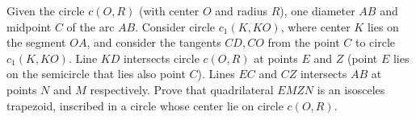 Given the circle $c(O,R)$ (with center $O$ and radius $R$), one diameter $AB$ and midpoint $C$ of the arc $AB$. Consider circle $c_1(K,KO)$, where center $K$ lies on the segment $OA$, and consider the tangents $CD,CO$ from the point $C$ to  circle $c_1(K,KO)$. Line $KD$ intersects circle $c(O,R)$ at points $E$ and $Z$ (point $E$ lies on the semicircle that lies also point $C$). Lines $EC$ and $CZ$ intersects $AB$ at points $N$ and $M$ respectively. Prove that quadrilateral $EMZN$ is an isosceles trapezoid, inscribed in a circle whose center lie on circle $c(O,R)$.